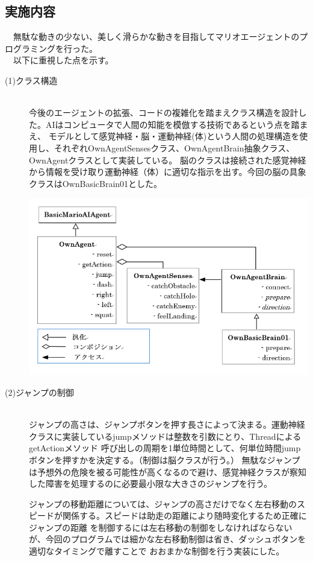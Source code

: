 \documentclass[a4j]{jarticle}
\begin{document}
\subsection{実施内容}
　無駄な動きの少ない、美しく滑らかな動きを目指してマリオエージェントのプログラミングを行った。\\
　以下に重視した点を示す。
 \begin{description}
 
  \item[(1)クラス構造]~\\
  	今後のエージェントの拡張、コードの複雑化を踏まえクラス構造を設計した。AIはコンピュータで人間の知能を模倣する技術であるという点を踏まえ、
  	モデルとして感覚神経・脳・運動神経(体)という人間の処理構造を使用し、それぞれOwnAgentSensesクラス、OwnAgentBrain抽象クラス、OwnAgentクラスとして実装している。
  	脳のクラスは接続された感覚神経から情報を受け取り運動神経（体）に適切な指示を出す。今回の脳の具象クラスはOwnBasicBrain01とした。
  	\begin{center}
		\includegraphics[scale=1.00]{uml01.png}
	\end{center}
	
  \item[(2)ジャンプの制御] ~\\
	ジャンプの高さは、ジャンプボタンを押す長さによって決まる。運動神経クラスに実装しているjumpメソッドは整数を引数にとり、ThreadによるgetActionメソッド
	呼び出しの周期を1単位時間として、何単位時間jumpボタンを押すかを決定する。（制御は脳クラスが行う。）
	無駄なジャンプは予想外の危険を被る可能性が高くなるので避け、感覚神経クラスが察知した障害を処理するのに必要最小限な大きさのジャンプを行う。
	
	ジャンプの移動距離については、ジャンプの高さだけでなく左右移動のスピードが関係する。スピードは助走の距離により随時変化するため正確にジャンプの距離
	を制御するには左右移動の制御をしなければならないが、今回のプログラムでは細かな左右移動制御は省き、ダッシュボタンを適切なタイミングで離すことで
	おおまかな制御を行う実装にした。
	

\end{description}
\end{document}
